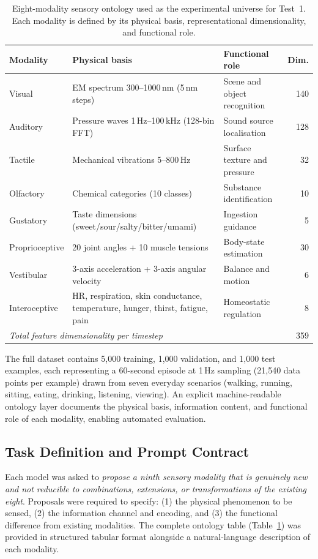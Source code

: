 \documentclass[pdflatex,sn-mathphys-num]{sn-jnl}
\begin{document}
\begin{table}[tp]
\caption{Eight-modality sensory ontology used as the experimental universe for Test~1.
Each modality is defined by its physical basis, representational dimensionality, and
functional role.}
\label{tab:modalities}
\begin{tabularx}{\textwidth}{lXXr}
\toprule
\textbf{Modality} & \textbf{Physical basis} & \textbf{Functional role} & \textbf{Dim.} \\
\midrule
Visual       & EM spectrum 300--1000\,nm (5\,nm steps) & Scene and object recognition & 140 \\
Auditory     & Pressure waves 1\,Hz--100\,kHz (128-bin FFT) & Sound source localisation & 128 \\
Tactile      & Mechanical vibrations 5--800\,Hz & Surface texture and pressure & 32 \\
Olfactory    & Chemical categories (10 classes) & Substance identification & 10 \\
Gustatory    & Taste dimensions (sweet/sour/salty/bitter/umami) & Ingestion guidance & 5 \\
Proprioceptive & 20 joint angles + 10 muscle tensions & Body-state estimation & 30 \\
Vestibular   & 3-axis acceleration + 3-axis angular velocity & Balance and motion & 6 \\
Interoceptive & HR, respiration, skin conductance, temperature, hunger, thirst, fatigue, pain & Homeostatic regulation & 8 \\
\midrule
\multicolumn{3}{l}{\textit{Total feature dimensionality per timestep}} & 359 \\
\bottomrule
\end{tabularx}
\end{table}

The full dataset contains 5,000 training, 1,000 validation, and 1,000 test examples, each
representing a 60-second episode at 1\,Hz sampling (21,540 data points per example) drawn from
seven everyday scenarios (walking, running, sitting, eating, drinking, listening, viewing).  An
explicit machine-readable ontology layer documents the physical basis, information content, and
functional role of each modality, enabling automated evaluation.

\subsection{Task Definition and Prompt Contract}

Each model was asked to \emph{propose a ninth sensory modality that is genuinely new and not
reducible to combinations, extensions, or transformations of the existing eight}.  Proposals
were required to specify: (1) the physical phenomenon to be sensed, (2) the information channel
and encoding, and (3) the functional difference from existing modalities.  The complete ontology
table (Table~\ref{tab:modalities}) was provided in structured tabular format alongside a
natural-language description of each modality.
\end{document}
